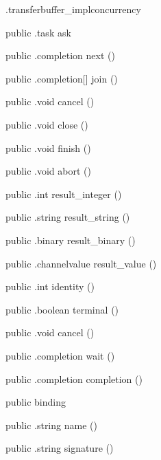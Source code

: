 \begin{CrexxClass}{.transferbuffer\_impl}{concurrency}
\begin{Members}
    \Method
      {public}
      {.task}
      {ask}
      {}

    \Method
      {public}
      {.completion}
      {next}
      {()}

    \Method
      {public}
      {.completion[]}
      {join}
      {()}

    \Method
      {public}
      {.void}
      {cancel}
      {()}

    \Method
      {public}
      {.void}
      {close}
      {()}

    \Method
      {public}
      {.void}
      {finish}
      {()}

    \Method
      {public}
      {.void}
      {abort}
      {()}

    \Method
      {public}
      {.int}
      {result\_integer}
      {()}

    \Method
      {public}
      {.string}
      {result\_string}
      {()}

    \Method
      {public}
      {.binary}
      {result\_binary}
      {()}

    \Method
      {public}
      {.channelvalue}
      {result\_value}
      {()}

    \Method
      {public}
      {.int}
      {identity}
      {()}

    \Method
      {public}
      {.boolean}
      {terminal}
      {()}

    \Method
      {public}
      {.void}
      {cancel}
      {()}

    \Method
      {public}
      {.completion}
      {wait}
      {()}

    \Method
      {public}
      {.completion}
      {completion}
      {()}

    \Factory
      {public}
      {binding}
      {}

    \Method
      {public}
      {.string}
      {name}
      {()}

    \Method
      {public}
      {.string}
      {signature}
      {()}


\end{Members}
\end{CrexxClass}
